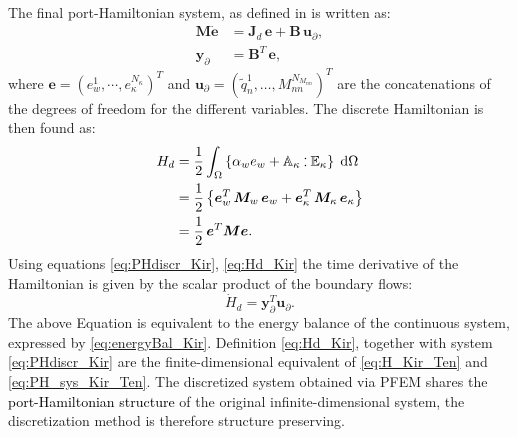 \documentclass[11pt]{article}
\newcommand{\revOne}[1]{\textcolor{black}{#1}}
\def\onedot{$\mathsurround0pt\ldotp$}
\def\cddot{%
	\mathbin{\vcenter{\baselineskip.67ex
			\hbox{\onedot}\hbox{\onedot}}%
}}
\begin{document}
{\begin{equation}
\begin{aligned}
		\end{aligned}
		\end{equation}
		The final port-Hamiltonian system, as defined in \cite{beattie2018linear} is written as:
		\begin{equation}
		\label{eq:PHdiscr_Kir}
		\begin{aligned}
		\bm{M} \dot{\bm{e}} &= \bm{J}_d  \,\bm{e} + \bm{B} \, \bm{u}_{\partial}, \\
		\bm{y}_{\partial} &= \bm{B}^T \, \bm{e},
		\end{aligned} 
		\end{equation}
		where $\bm{e} = \left(e_w^1, \cdots, e_{\kappa}^{N_{\kappa}}\right)^T$ and $\bm{u}_{\partial} = \left(\widetilde{q}_n^1, \dots, M_{nn}^{N_{M_{nn}}}\right)^T$ are the concatenations of the degrees of freedom for the different variables. The discrete Hamiltonian is then found as:
		\begin{equation}
		\label{eq:Hd_Kir}
		\begin{aligned}
		H_d &= \frac{1}{2} \int_{\Omega} \left\{ \alpha_w e_w + \mathbb{A}_{\kappa} \cddot \mathbb{E}_\kappa \right\} \d\Omega \\
		&=  \frac{1}{2}  \left\{ \bm{e}_w^T \, \bm{M}_w \, \bm{e}_w + \bm{e}_\kappa^T \, \bm{M}_\kappa \, \bm{e}_\kappa \right\} \\
		&=  \frac{1}{2} \, \bm{e}^T  \bm{M}  \bm{e}.
		\end{aligned}
		\end{equation}
	}
	Using equations \eqref{eq:PHdiscr_Kir}, \eqref{eq:Hd_Kir} the time derivative of the Hamiltonian is given by the scalar product of the boundary flows:
	\begin{equation}
	\dot{H}_d = \bm{y}_{\partial}^T \bm{u}_{\partial}.
	\end{equation}
	The above Equation is equivalent to the energy balance of the continuous system, expressed by \eqref{eq:energyBal_Kir}. Definition \eqref{eq:Hd_Kir}, together with system \eqref{eq:PHdiscr_Kir} are the finite-dimensional equivalent of \eqref{eq:H_Kir_Ten} and  \eqref{eq:PH_sys_Kir_Ten}. The discretized system obtained via PFEM shares the \revOne{port-Hamiltonian structure} of the original infinite-dimensional system, the discretization method is therefore structure preserving. 
	
\end{document}
